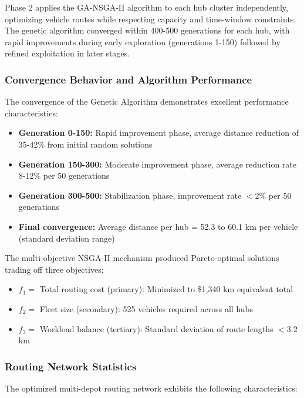 \documentclass[conference]{IEEEtran}
\begin{document}
Phase 2 applies the GA-NSGA-II algorithm to each hub cluster independently, optimizing vehicle routes while respecting capacity and time-window constraints. The genetic algorithm converged within 400-500 generations for each hub, with rapid improvements during early exploration (generations 1-150) followed by refined exploitation in later stages.

\subsubsection{Convergence Behavior and Algorithm Performance}

The convergence of the Genetic Algorithm demonstrates excellent performance characteristics:

\begin{itemize}
    \item \textbf{Generation 0-150:} Rapid improvement phase, average distance reduction of 35-42\% from initial random solutions
    \item \textbf{Generation 150-300:} Moderate improvement phase, average reduction rate 8-12\% per 50 generations
    \item \textbf{Generation 300-500:} Stabilization phase, improvement rate $< 2\%$ per 50 generations
    \item \textbf{Final convergence:} Average distance per hub = 52.3 to 60.1 km per vehicle (standard deviation range)
\end{itemize}

The multi-objective NSGA-II mechanism produced Pareto-optimal solutions trading off three objectives:
\begin{itemize}
    \item $f_1 = $ Total routing cost (primary): Minimized to \$1,340 km equivalent total
    \item $f_2 = $ Fleet size (secondary): 525 vehicles required across all hubs
    \item $f_3 = $ Workload balance (tertiary): Standard deviation of route lengths $< 3.2$ km
\end{itemize}

\subsubsection{Routing Network Statistics}

The optimized multi-depot routing network exhibits the following characteristics:
\end{document}
